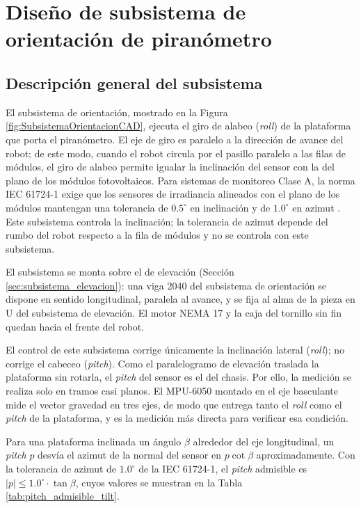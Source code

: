 \documentclass[../../General.tex]{subfiles}
\begin{document}
\section{Diseño de subsistema de orientación de piranómetro}

\subsection{Descripción general del subsistema}

El subsistema de orientación, mostrado en la Figura \ref{fig:SubsistemaOrientacionCAD}, ejecuta el giro de alabeo (\textit{roll}) de la plataforma que porta el piranómetro. El eje de giro es paralelo a la dirección de avance del robot; de este modo, cuando el robot circula por el pasillo paralelo a las filas de módulos, el giro de alabeo permite igualar la inclinación del sensor con la del plano de los módulos fotovoltaicos. Para sistemas de monitoreo Clase A, la norma IEC 61724-1 exige que los sensores de irradiancia alineados con el plano de los módulos mantengan una tolerancia de $0.5^\circ$ en inclinación y de $1.0^\circ$ en azimut \citep{IEC61724-1_2021}. Este subsistema controla la inclinación; la tolerancia de azimut depende del rumbo del robot respecto a la fila de módulos y no se controla con este subsistema.

El subsistema se monta sobre el de elevación (Sección \ref{sec:subsistema_elevacion}): una viga 2040 del subsistema de orientación se dispone en sentido longitudinal, paralela al avance, y se fija al alma de la pieza en U del subsistema de elevación. El motor NEMA 17 y la caja del tornillo sin fin quedan hacia el frente del robot.

El control de este subsistema corrige únicamente la inclinación lateral (\textit{roll}); no corrige el cabeceo (\textit{pitch}). Como el paralelogramo de elevación traslada la plataforma sin rotarla, el \textit{pitch} del sensor es el del chasis. Por ello, la medición se realiza solo en tramos casi planos. El MPU-6050 montado en el eje basculante mide el vector gravedad en tres ejes, de modo que entrega tanto el \textit{roll} como el \textit{pitch} de la plataforma, y es la medición más directa para verificar esa condición.

Para una plataforma inclinada un ángulo $\beta$ alrededor del eje longitudinal, un \textit{pitch} $p$ desvía el azimut de la normal del sensor en $p \cot\beta$ aproximadamente. Con la tolerancia de azimut de $1.0^\circ$ de la IEC 61724-1, el \textit{pitch} admisible es $|p| \leq 1.0^\circ \cdot \tan\beta$, cuyos valores se muestran en la Tabla \ref{tab:pitch_admisible_tilt}.
\end{document}
